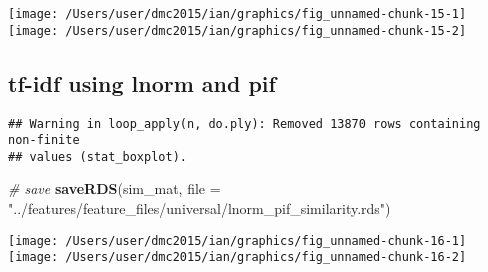 \documentclass[10pt]{report}
\newenvironment{Shaded}{}{}
\newcommand{\KeywordTok}[1]{\textcolor[rgb]{0.00,0.44,0.13}{\textbf{{#1}}}}
\newcommand{\DataTypeTok}[1]{\textcolor[rgb]{0.56,0.13,0.00}{{#1}}}
\newcommand{\StringTok}[1]{\textcolor[rgb]{0.25,0.44,0.63}{{#1}}}
\newcommand{\CommentTok}[1]{\textcolor[rgb]{0.38,0.63,0.69}{\textit{{#1}}}}
\newcommand{\NormalTok}[1]{{#1}}
\begin{document}
\begin{center}\texttt{[image: /Users/user/dmc2015/ian/graphics/fig\_unnamed-chunk-15-1]} \texttt{[image: /Users/user/dmc2015/ian/graphics/fig\_unnamed-chunk-15-2]} \end{center}

\subsection{tf-idf using lnorm and
pif}\label{tf-idf-using-lnorm-and-pif}

\begin{Shaded}
\end{Shaded}

\begin{verbatim}
## Warning in loop_apply(n, do.ply): Removed 13870 rows containing non-finite
## values (stat_boxplot).
\end{verbatim}

\begin{Shaded}
\begin{Highlighting}[]
\CommentTok{# save}
\KeywordTok{saveRDS}\NormalTok{(sim_mat, }\DataTypeTok{file =} \StringTok{"../features/feature_files/universal/lnorm_pif_similarity.rds"}\NormalTok{)}
\end{Highlighting}
\end{Shaded}

\begin{center}\texttt{[image: /Users/user/dmc2015/ian/graphics/fig\_unnamed-chunk-16-1]} \texttt{[image: /Users/user/dmc2015/ian/graphics/fig\_unnamed-chunk-16-2]} \end{center}
\end{document}

